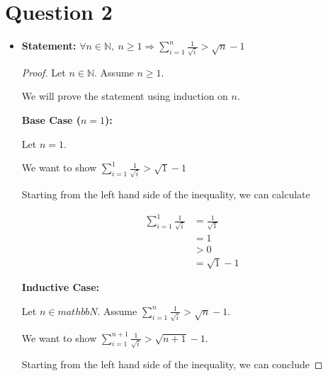 \documentclass[12pt]{article}
\begin{document}
\section*{Question 2}
\begin{itemize}
    \item
    \textbf{Statement:} $\forall n \in \mathbb{N},\:n \geq 1 \Rightarrow
    \sum\limits_{i=1}^{n} \frac{1}{\sqrt{i}} > \sqrt{n} - 1$

    \bigskip

    \begin{proof}

        Let $n \in \mathbb{N}$. Assume $n \geq 1$.

        \bigskip

        We will prove the statement using induction on $n$.

        \bigskip

        \textbf{Base Case ($n = 1$):}

        \bigskip

        Let $n = 1$.

        \bigskip

        We want to show $\sum\limits_{i=1}^1 \frac{1}{\sqrt{i}} > \sqrt{1} - 1$

        \bigskip

        Starting from the left hand side of the inequality, we can calculate

        \setcounter{equation}{0}
        \begin{align}
            \sum\limits_{i=1}^1 \frac{1}{\sqrt{i}} &= \frac{1}{\sqrt{1}}\\
            &= 1\\
            &> 0\\
            &= \sqrt{1} - 1
        \end{align}

        \bigskip

        \textbf{Inductive Case:}

        \bigskip

        Let $n \in mathbb{N}$. Assume $\sum\limits_{i=1}^{n} \frac{1}{\sqrt{i}} > \sqrt{n} - 1$.

        \bigskip

        We want to show $\sum\limits_{i=1}^{n+1} \frac{1}{\sqrt{i}} > \sqrt{n+1} - 1$.

        \bigskip

        Starting from the left hand side of the inequality, we can conclude


\end{proof}
\end{itemize}
\end{document}
